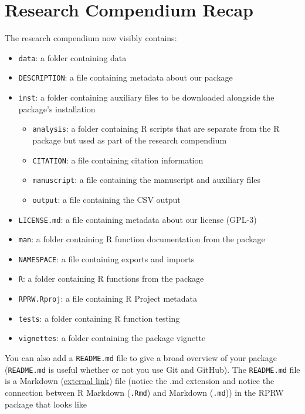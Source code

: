 \documentclass[
]{book}
\providecommand{\tightlist}{%
  \setlength{\itemsep}{0pt}\setlength{\parskip}{0pt}}
\begin{document}
\hypertarget{rc-recap}{%
\section{Research Compendium Recap}\label{rc-recap}}

The research compendium now visibly contains:

\begin{itemize}
\tightlist
\item
  \texttt{data}: a folder containing data
\item
  \texttt{DESCRIPTION}: a file containing metadata about our package
\item
  \texttt{inst}: a folder containing auxiliary files to be downloaded alongside the package's installation

  \begin{itemize}
  \tightlist
  \item
    \texttt{analysis}: a folder containing R scripts that are separate from the R package but used as part of the research compendium
  \item
    \texttt{CITATION}: a file containing citation information
  \item
    \texttt{manuscript}: a file containing the manuscript and auxiliary files
  \item
    \texttt{output}: a file containing the CSV output
  \end{itemize}
\item
  \texttt{LICENSE.md}: a file containing metadata about our license (GPL-3)
\item
  \texttt{man}: a folder containing R function documentation from the package
\item
  \texttt{NAMESPACE}: a file containing exports and imports
\item
  \texttt{R}: a folder containing R functions from the package
\item
  \texttt{RPRW.Rproj}: a file containing R Project metadata
\item
  \texttt{tests}: a folder containing R function testing
\item
  \texttt{vignettes}: a folder containing the package vignette
\end{itemize}

You can also add a \texttt{README.md} file to give a broad overview of your package (\texttt{README.md} is useful whether or not you use Git and GitHub). The \texttt{README.md} file is a Markdown (\href{https://www.markdownguide.org/}{external link}) file (notice the .md extension and notice the connection between R Markdown (\texttt{.Rmd}) and Markdown (\texttt{.md})) in the RPRW package that looks like
\end{document}

